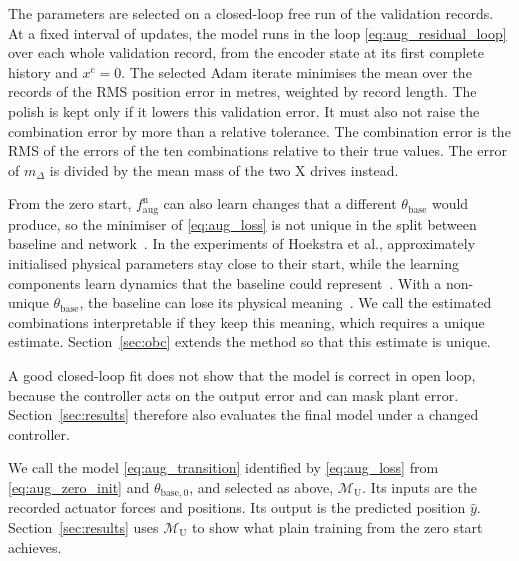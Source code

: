 The parameters are selected on a closed-loop free run of the validation
records.
At a fixed interval of updates, the model runs in the loop
\eqref{eq:aug_residual_loop} over each whole validation record, from the
encoder state at its first complete history and $x^{\mathrm c}=0$.
The selected Adam iterate minimises the mean over the records of the RMS
position error in metres, weighted by record length.
The polish is kept only if it lowers this validation error.
It must also not raise the combination error by more than a relative
tolerance.
The combination error is the RMS of the errors of the ten combinations
relative to their true values.
The error of $m_\Delta$ is divided by the mean mass of the two X drives
instead.

From the zero start, $f^{\mathrm n}_{\mathrm{aug}}$ can also learn changes that
a different $\theta_{\mathrm{base}}$ would produce, so the minimiser of
\eqref{eq:aug_loss} is not unique in the split between baseline and
network~\cite[Sec.~5.2]{hoekstra2026lfr}.
In the experiments of Hoekstra et al., approximately initialised physical
parameters stay close to their start, while the learning components learn
dynamics that the baseline could represent~\cite[Sec.~6.3]{hoekstra2026lfr}.
With a non-unique $\theta_{\mathrm{base}}$, the baseline can lose its physical
meaning~\cite[Sec.~3]{gyorok2026obc}.
We call the estimated combinations interpretable if they keep this meaning,
which requires a unique estimate.
Section~\ref{sec:obc} extends the method so that this estimate is unique.

A good closed-loop fit does not show that the model is correct in open loop,
because the controller acts on the output error and can mask plant error.
Section~\ref{sec:results} therefore also evaluates the final model under a
changed controller.

We call the model \eqref{eq:aug_transition} identified by \eqref{eq:aug_loss}
from \eqref{eq:aug_zero_init} and $\theta_{\mathrm{base},0}$, and selected as
above, $\mathcal M_{\mathrm U}$.
Its inputs are the recorded actuator forces and positions.
Its output is the predicted position $\hat y$.
Section~\ref{sec:results} uses $\mathcal M_{\mathrm U}$ to show what plain
training from the zero start achieves.


